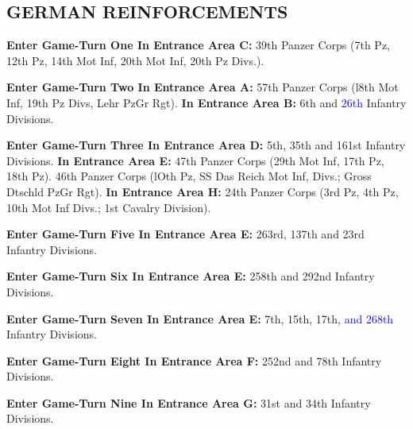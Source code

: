 \subsection{GERMAN REINFORCEMENTS}

\begin{flushleft}
  \textbf{Enter Game-Turn One In Entrance Area C:}
  \break
  39th Panzer Corps (7th Pz, 12th Pz, 14th Mot Inf,
  20th Mot Inf, 20th Pz Divs.).

  \textbf{Enter Game-Turn Two In Entrance Area A:}
  \break
  57th Panzer Corps (l8th Mot Inf, 19th Pz Divs, Lehr PzGr Rgt).
  \break
  \textbf{In Entrance Area B:}
  \break
  6th and \textcolor{blue}{26th} Infantry Divisions.

  \textbf{Enter Game-Turn Three In Entrance Area D:}
  \break
  5th, 35th and 161st Infantry Divisions.
  \break
  \textbf{In Entrance Area E:}
  \break
  47th Panzer Corps (29th Mot Inf, 17th Pz, 18th Pz).
  46th Panzer Corps (lOth Pz, SS Das Reich Mot Inf, Divs.; Gross Dtschld PzGr Rgt).
  \break
  \textbf{In Entrance Area H:}
  24th Panzer Corps (3rd Pz, 4th Pz, 10th Mot Inf Divs.; 1st Cavalry Division).

  \textbf{Enter Game-Turn Five In Entrance Area E:}
  \break
  263rd, 137th and 23rd Infantry Divisions.

  \textbf{Enter Game-Turn Six In Entrance Area E:}
  \break
  258th and 292nd Infantry Divisions.

  \textbf{Enter Game-Turn Seven In Entrance Area E:}
  \break
  7th, 15th, 17th, \textcolor{blue}{and 268th} Infantry Divisions.

  \textbf{Enter Game-Turn Eight In Entrance Area F:}
  \break
  252nd and 78th Infantry Divisions.

  \textbf{Enter Game-Turn Nine In Entrance Area G:}
  \break
  31st and 34th Infantry Divisions.
\end{flushleft}
\vfill
